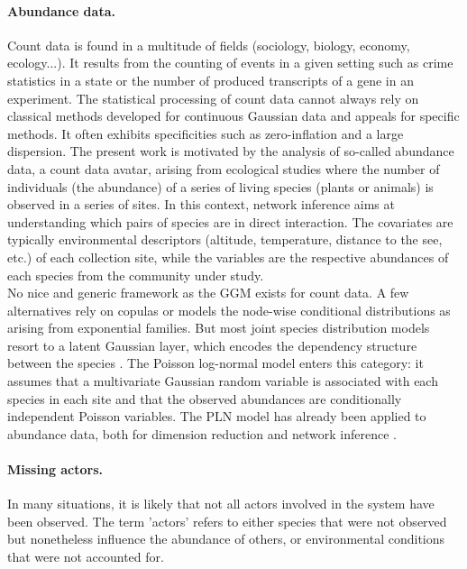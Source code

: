 \paragraph{Abundance data.}
{Count data is found in a multitude of fields (sociology, biology, economy, ecology...). It results from the counting of events in a given setting such as crime statistics in a state or the number of produced transcripts of a gene in an experiment. The statistical processing of count data cannot always rely on  classical methods developed for continuous Gaussian data and appeals for specific methods. It often exhibits specificities such as zero-inflation and a large dispersion. The present work is motivated by the analysis of so-called abundance data, a count data avatar,  arising from ecological studies where the number of individuals (the abundance) of a series of living species (plants or animals) is observed in a series of sites.} 
In this context, network inference aims at understanding which pairs of species are in direct interaction. The covariates are typically environmental descriptors (altitude, temperature, distance to the see, etc.) of each collection site, while the variables are the respective abundances of each species from the community under study. \\
No nice and generic framework as the GGM exists for count data. A few alternatives rely on copulas  \citep{inouye} or models the node-wise conditional distributions as arising from exponential families. But most joint species distribution models resort to a latent Gaussian layer, which encodes the dependency structure between the species \citep{WBO15,PHW18,PWT19}. The Poisson log-normal model \citep[PLN:][]{AiH89} enters this category: it assumes that a multivariate Gaussian random variable is associated with each species in each site and that the observed abundances are conditionally independent Poisson variables. The PLN model has already been applied to abundance data, both for dimension reduction \citep{CMR18} and network inference \citep{CMR19,MRA20}.

\paragraph{Missing actors.}
In many situations, it is likely that not all actors involved in the system have been observed. The term 'actors' refers to either species that were not observed but nonetheless influence the abundance of others, or environmental conditions that were not accounted for. 


